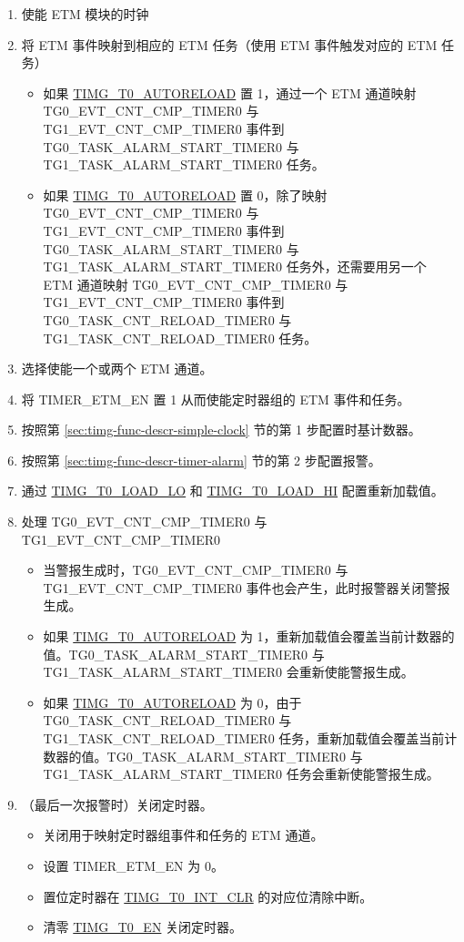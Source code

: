 \documentclass[main\_\_CN.tex]{subfiles}
\begin{document}
\begin{enumerate}
    \item 使能 ETM 模块的时钟
    \item 将 ETM 事件映射到相应的 ETM 任务（使用 ETM 事件触发对应的 ETM 任务）
    \begin{itemize}
        \item 如果 \hyperref[fielddesc:TIMGTXAUTORELOAD]{TIMG\_T0\_AUTORELOAD} 置 1，通过一个 ETM 通道映射 TG0\_EVT\_CNT\_CMP\_TIMER0 与 TG1\_EVT\_CNT\_CMP\_TIMER0 事件到 TG0\_TASK\_ALARM\_START\_TIMER0 与 TG1\_TASK\_ALARM\_START\_TIMER0 任务。
        \item 如果 \hyperref[fielddesc:TIMGTXAUTORELOAD]{TIMG\_T0\_AUTORELOAD} 置 0，除了映射 TG0\_EVT\_CNT\_CMP\_TIMER0 与 TG1\_EVT\_CNT\_CMP\_TIMER0 事件到TG0\_TASK\_ALARM\_START\_TIMER0 与 TG1\_TASK\_ALARM\_START\_TIMER0 任务外，还需要用另一个 ETM 通道映射 TG0\_EVT\_CNT\_CMP\_TIMER0 与 TG1\_EVT\_CNT\_CMP\_TIMER0 事件到 TG0\_TASK\_CNT\_RELOAD\_TIMER0 与 TG1\_TASK\_CNT\_RELOAD\_TIMER0 任务。
    \end{itemize}
    \item 选择使能一个或两个 ETM 通道。
    \item 将 TIMER\_ETM\_EN 置 1 从而使能定时器组的 ETM 事件和任务。
    \item 按照第 \ref{sec:timg-func-descr-simple-clock} 节的第 1 步配置时基计数器。
    \item 按照第 \ref{sec:timg-func-descr-timer-alarm} 节的第 2 步配置报警。
    \item 通过 \hyperref[fielddesc:TIMGTXLOADLO]{TIMG\_T0\_LOAD\_LO} 和 \hyperref[fielddesc:TIMGTXLOADHI]{TIMG\_T0\_LOAD\_HI} 配置重新加载值。
    \item 处理 TG0\_EVT\_CNT\_CMP\_TIMER0 与 TG1\_EVT\_CNT\_CMP\_TIMER0
    \begin{itemize}
        \item 当警报生成时，TG0\_EVT\_CNT\_CMP\_TIMER0 与 TG1\_EVT\_CNT\_CMP\_TIMER0 事件也会产生，此时报警器关闭警报生成。
        \item 如果 \hyperref[fielddesc:TIMGTXAUTORELOAD]{TIMG\_T0\_AUTORELOAD} 为 1，重新加载值会覆盖当前计数器的值。TG0\_TASK\_ALARM\_START\_TIMER0 与 TG1\_TASK\_ALARM\_START\_TIMER0 会重新使能警报生成。
        \item 如果 \hyperref[fielddesc:TIMGTXAUTORELOAD]{TIMG\_T0\_AUTORELOAD} 为 0，由于 TG0\_TASK\_CNT\_RELOAD\_TIMER0 与 TG1\_TASK\_CNT\_RELOAD\_TIMER0 任务，重新加载值会覆盖当前计数器的值。TG0\_TASK\_ALARM\_START\_TIMER0 与 TG1\_TASK\_ALARM\_START\_TIMER0 任务会重新使能警报生成。
    \end{itemize}
    \item（最后一次报警时）关闭定时器。
    \begin{itemize}
        \item 关闭用于映射定时器组事件和任务的 ETM 通道。
        \item 设置 TIMER\_ETM\_EN 为 0。
        \item 置位定时器在 \hyperref[fielddesc:TIMGT0INTCLR]{TIMG\_T0\_INT\_CLR} 的对应位清除中断。
        \item 清零 \hyperref[fielddesc:TIMGTXEN]{TIMG\_T0\_EN} 关闭定时器。
    \end{itemize}
\end{enumerate}
\end{document}
